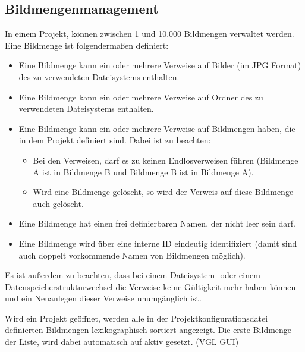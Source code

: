 \subsection{Bildmengenmanagement}
\label{subsec:bildmengenmgmt}
	In einem Projekt, können zwischen 1 und 10.000 Bildmengen verwaltet werden. Eine Bildmenge ist folgendermaßen definiert:
	\begin{itemize}
		\item Eine Bildmenge kann ein oder mehrere Verweise auf Bilder (im JPG Format) des zu verwendeten Dateisystems enthalten.
		\item Eine Bildmenge kann ein oder mehrere Verweise auf Ordner des zu verwendeten Dateisystems enthalten.
		\item Eine Bildmenge kann ein oder mehrere Verweise auf Bildmengen haben, die in dem Projekt definiert sind. Dabei ist zu beachten:
			\begin{itemize}
				\item Bei den Verweisen, darf es zu keinen Endlosverweisen führen (Bildmenge A ist in Bildmenge B und Bildmenge B ist in Bildmenge A).
				\item Wird eine Bildmenge gelöscht, so wird der Verweis auf diese Bildmenge auch gelöscht.
			\end{itemize}
		\item Eine Bildmenge hat einen frei definierbaren Namen, der nicht leer sein darf.
		\item Eine Bildmenge wird über eine interne ID eindeutig identifiziert (damit sind auch doppelt vorkommende Namen von Bildmengen möglich).
	\end{itemize}
	Es ist außerdem zu beachten, dass bei einem Dateisystem- oder einem Datenspeicherstrukturwechsel die Verweise keine Gültigkeit mehr haben können und ein Neuanlegen dieser Verweise unumgänglich ist.\par Wird ein Projekt geöffnet, werden alle in der Projektkonfigurationsdatei definierten Bildmengen lexikographisch sortiert angezeigt. Die erste Bildmenge der Liste, wird dabei automatisch auf aktiv gesetzt. (VGL GUI)
